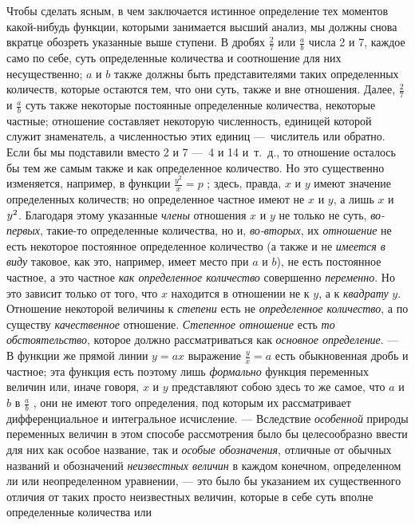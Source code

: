 Чтобы сделать ясным, в чем заключается истинное определение тех моментов
какой-нибудь функции, которыми занимается высший анализ, мы должны снова
вкратце обозреть указанные выше ступени. В дробях  $\frac 2 7$  или  $\frac
a b$  числа 2 и 7, каждое само по себе, суть определенные количества и
соотношение для них несущественно; $a$ и
$b$ также должны быть представителями таких
определенных количеств, которые остаются тем, что они суть, также и вне
отношения. Далее,  $\frac 2 7$  и  $\frac a b$  суть также некоторые
постоянные определенные количества, некоторые частные; отношение составляет
некоторую численность, единицей которой служит знаменатель, а численностью
этих единиц —~числитель или обратно. Если бы мы подставили вместо 2 и 7 —~4
и 14 и~т.~д., то отношение осталось бы тем же самым также и как
определенное количество. Но это существенно изменяется, например, в функции
 $\frac{y^2} x=p$ ; здесь, правда, $x$ и
$y$ имеют значение определенных количеств; но
определенное частное имеют не $x$ и
$y$, а лишь $x$ и
$y\textsuperscript{2}$. Благодаря этому указанные
{\em члены} отношения $x$ и
$y$ не только не суть,
{\em во-первых}, такие-то определенные количества, но
и, {\em во-вторых}, их
{\em отношение} не есть некоторое постоянное
определенное количество (а также и не {\em имеется в
виду} таковое, как это, например, имеет место при
$a$ и $b$), не есть
постоянное частное, а это частное {\em как определенное
количество} совершенно {\em переменно}. Но это зависит
только от того, что $x$ находится в отношении не к
$y$, а к {\em квадрату}
$y$. Отношение некоторой величины к
{\em степени} есть не
{\em определенное количество}, а по существу
{\em качественное} отношение.
{\em Степенное отношение} есть
{\em то обстоятельство}, которое должно рассматриваться
как {\em основное определение}. — В функции же прямой
линии  $y=\mathit{ax}$  выражение  $\frac y x=a$  есть обыкновенная дробь и
частное; эта функция есть поэтому лишь {\em формально}
функция переменных величин или, иначе говоря, $x$ и
$y$ представляют собою здесь то же самое, что
$a$ и $b$ в
$\frac a b$ , они не имеют того определения, под которым их рассматривает
дифференциальное и интегральное исчисление. — Вследствие
{\em особенной} природы переменных величин в этом
способе рассмотрения было бы целесообразно ввести для них как особое
название, так и {\em особые обозначения}, отличные от
обычных названий и обозначений {\em неизвестных
величин} в каждом конечном, определенном ли или неопределенном уравнении, —
это было бы указанием их существенного отличия от таких просто неизвестных
величин, которые в себе суть вполне определенные количества или

